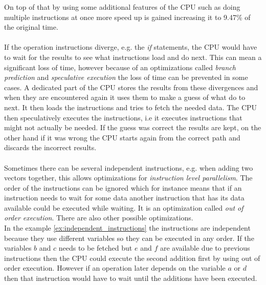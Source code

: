 \documentclass[10pt,a4paper]{report}
\begin{document}
On top of that by using some additional features of the CPU such as doing multiple instructions at once more speed up is gained increasing it to 9.47\% of the original time\cite{drepper2007cpumemory}. \\
\\
If the operation instructions diverge, e.g. the \emph{if} statements, the CPU would have to wait for the results to see what instructions load and do next\cite{drepper2007cpumemory}. This can mean a significant loss of time, however because of an optimizations called \emph{branch prediction} and \emph{speculative execution} the loss of time can be prevented in some cases\cite{drepper2007cpumemory}. A dedicated part of the CPU stores the results from these divergences and when they are encountered again it uses them to make a guess of what do to next\cite{drepper2007cpumemory}. It then loads the instructions and tries to fetch the needed data\cite{drepper2007cpumemory}. The CPU then speculatively executes the instructions, i.e it executes instructions that might not actually be needed\cite{drepper2007cpumemory}. If the guess was correct the results are kept, on the other hand if it was wrong the CPU starts again from the correct path and discards the incorrect results\cite{drepper2007cpumemory}.\\
\\
Sometimes there can be several independent instructions, e.g. when adding two vectors together, this allows optimizations for \emph{instruction level parallelism}\cite{introduction_hpc_hager}. The order of the instructions can be ignored which for instance means that if an instruction needs to wait for some data another instruction that has its data available could be executed while waiting\cite{introduction_hpc_hager}. It is an optimization called \emph{out of order execution}\cite{introduction_hpc_hager}. There are also other possible optimizations\cite{introduction_hpc_hager}.
\\
In the example \ref{ex:independent_instructions} the instructions are independent because they use different variables so they can be executed in any order. If the variables $b$ and $c$ needs to be fetched but $e$ and $f$ are available due to previous instructions then the CPU could execute the second addition first by using out of order execution. However if an operation later depends on the variable $a$ or $d$ then that instruction would have to wait until the additions have been executed.
\end{document}

